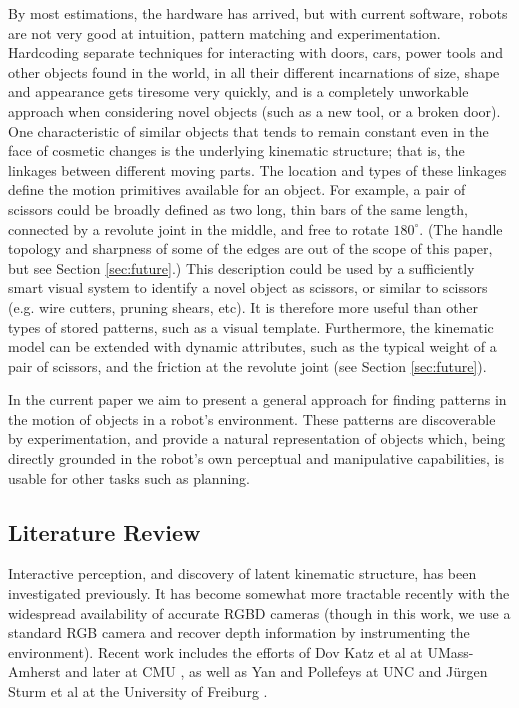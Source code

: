 \documentclass[letterpaper, 10 pt, conference]{ieeeconf}  %
\begin{document}
By most estimations, the hardware has arrived, but with current software, robots are not very good at intuition, pattern matching and experimentation. Hardcoding separate techniques for interacting with doors, cars, power tools and other objects found in the world, in all their different incarnations of size, shape and appearance gets tiresome very quickly, and is a completely unworkable approach when considering novel objects (such as a new tool, or a broken door). One characteristic of similar objects that tends to remain constant even in the face of cosmetic changes is the underlying kinematic structure; that is, the linkages between different moving parts. The location and types of these linkages define the motion primitives available for an object. For example, a pair of scissors could be broadly defined as two long, thin bars of the same length, connected by a revolute joint in the middle, and free to rotate $180^\circ$. (The handle topology and sharpness of some of the edges are out of the scope of this paper, but see Section \ref{sec:future}.) This description could be used by a sufficiently smart visual system to identify a novel object as scissors, or similar to scissors (e.g. wire cutters, pruning shears, etc). It is therefore more useful than other types of stored patterns, such as a visual template. 
Furthermore, the kinematic model can be extended with dynamic attributes, such as the typical weight of a pair of scissors, and the friction at the revolute joint (see Section \ref{sec:future}).

In the current paper we aim to present a general approach for finding patterns in the motion of objects in a robot's environment. These patterns are discoverable by experimentation, and provide a natural representation of objects which, being directly grounded in the robot's own perceptual and manipulative capabilities, is usable for other tasks such as planning.

\subsection{Literature Review}

Interactive perception, and discovery of latent kinematic structure, has been investigated previously. It has become somewhat more tractable recently with the widespread availability of accurate RGBD cameras (though in this work, we use a standard RGB camera and recover depth information by instrumenting the environment). Recent work includes the efforts of Dov Katz et al at UMass-Amherst \cite{Katz2008,Katz2008a} and later at CMU \cite{Katz2012}, as well as Yan and Pollefeys at UNC \cite{Yan2006} and J\"{u}rgen Sturm et al at the University of Freiburg \cite{Sturm2011}.
\end{document}
